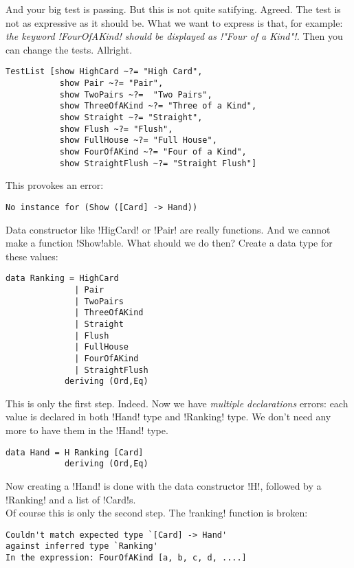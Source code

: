 \success And your big test is passing. But this is not quite satifying.
\lhN Agreed. The test is not as expressive as it should be. What we want to express is that, for example: \\
\emph{the keyword \il!FourOfAKind! should be displayed as \il!"Four of a Kind"!.}
\lhA Then you can change the tests.
\lhN Allright.
\begin{lstlisting}[frame=single]
 TestList [show HighCard ~?= "High Card",
           show Pair ~?= "Pair",
           show TwoPairs ~?=  "Two Pairs",
           show ThreeOfAKind ~?= "Three of a Kind",
           show Straight ~?= "Straight",
           show Flush ~?= "Flush",
           show FullHouse ~?= "Full House",
           show FourOfAKind ~?= "Four of a Kind",
           show StraightFlush ~?= "Straight Flush"] 
\end{lstlisting}
\error This provokes an error:
\begin{small}
\begin{verbatim}
No instance for (Show ([Card] -> Hand))
\end{verbatim}
\end{small}
\lhA \error Data constructor like \il!HigCard! or \il!Pair! are really functions. And we cannot make a function \il!Show!able.
\lhN What should we do then?
\lhA Create a data type for these values:
\begin{lstlisting}[frame=single]
data Ranking = HighCard
              | Pair
              | TwoPairs
              | ThreeOfAKind
              | Straight
              | Flush
              | FullHouse
              | FourOfAKind
              | StraightFlush
            deriving (Ord,Eq)
\end{lstlisting}
\error This is only the first step.
\lhN Indeed. Now we have \emph{multiple declarations} errors: each value is declared in both \il!Hand! type and \il!Ranking! type.
\lhA We don't need any more to have them in the \il!Hand! type. 
\begin{lstlisting}[frame=single]
data Hand = H Ranking [Card]
            deriving (Ord,Eq)
\end{lstlisting}            
\error Now creating a \il!Hand! is done with the data constructor \il!H!, followed by a \il!Ranking! and a list of \il!Card!s. \\ Of course this is only the second step.
\lhN The \il!ranking! function is broken: \\
\begin{small}
\begin{verbatim}
Couldn't match expected type `[Card] -> Hand'
against inferred type `Ranking'
In the expression: FourOfAKind [a, b, c, d, ....]
\end{verbatim}
\end{small}

